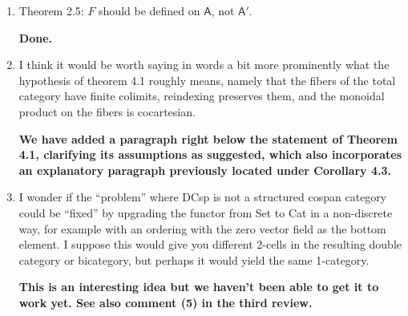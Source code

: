 \documentclass[reqno]{amsart}
\def\kenny{\color{blue} Kenny: }
\begin{document}
\begin{enumerate}
{\kenny Looks good to me.}
\fi

\item Theorem 2.5: $F$ should be defined on $\mathsf{A}$, not $\mathsf{A}'$.

{\bf Done.}

  

\item I think it would be worth saying in words a bit more prominently what the hypothesis of theorem 4.1 roughly means, namely that the fibers of 
the total 
category have finite colimits, reindexing preserves them, and the monoidal product on the fibers is cocartesian.

{\bf We have added a paragraph right below the statement of Theorem 4.1, clarifying its assumptions as suggested, which also incorporates an 
explanatory paragraph previously located under Corollary 4.3.} 

  

\item I wonder if the “problem” where DCsp is not a structured cospan category could be “fixed” by upgrading the functor from Set to Cat in a 
non-discrete 
way, for example with an ordering with the zero vector field as the bottom element. I suppose this would give you different 2-cells in the resulting 
double category or bicategory, but perhaps it would yield the same 1-category.

{\bf This is an interesting idea but we haven't been able to get it to work yet.  See also comment (5) in the third review.}

 
\end{enumerate}
\end{document}
